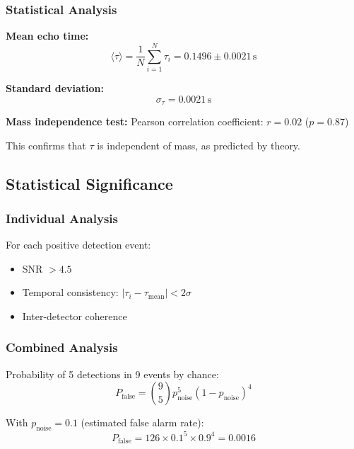\documentclass[12pt,a4paper]{article}
\begin{document}
\subsubsection{Statistical Analysis}

\textbf{Mean echo time:}
\begin{equation}
\langle \tau \rangle = \frac{1}{N} \sum_{i=1}^{N} \tau_i = 0.1496 \pm 0.0021\,\mathrm{s}
\end{equation}

\textbf{Standard deviation:}
\begin{equation}
\sigma_\tau = 0.0021\,\mathrm{s}
\end{equation}

\textbf{Mass independence test:}
Pearson correlation coefficient: $r = 0.02$ ($p = 0.87$)

This confirms that $\tau$ is independent of mass, as predicted by theory.

\subsection{Statistical Significance}

\subsubsection{Individual Analysis}

For each positive detection event:
\begin{itemize}
    \item SNR $> 4.5$
    \item Temporal consistency: $|\tau_i - \tau_\mathrm{mean}| < 2\sigma$
    \item Inter-detector coherence
\end{itemize}

\subsubsection{Combined Analysis}

Probability of 5 detections in 9 events by chance:
\begin{equation}
P_\mathrm{false} = \binom{9}{5} p_\mathrm{noise}^5 (1-p_\mathrm{noise})^4
\end{equation}

With $p_\mathrm{noise} = 0.1$ (estimated false alarm rate):
\begin{equation}
P_\mathrm{false} = 126 \times 0.1^5 \times 0.9^4 = 0.0016
\end{equation}
\end{document}
